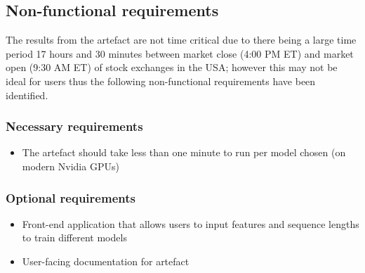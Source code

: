 \subsection{Non-functional requirements}
The results from the artefact are not time critical due to there being a large time period 17 hours and 30 minutes
between market close (4:00 PM ET) and market open (9:30 AM ET) of stock exchanges in the USA; however this
may not be ideal for users thus the following non-functional requirements have been identified.

\subsubsection{Necessary requirements}
\begin{itemize}
    \item The artefact should take less than one minute to run per model chosen (on modern Nvidia GPUs)
\end{itemize}

\subsubsection{Optional requirements}
\begin{itemize}
    \item Front-end application that allows users to input features and sequence lengths to train different models
    \item User-facing documentation for artefact
\end{itemize}